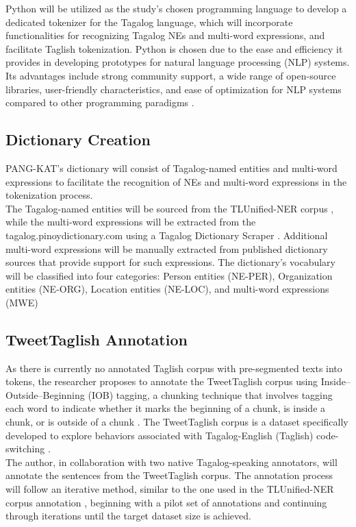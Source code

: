 \documentclass[journal]{./IEEE/IEEEtran}
\begin{document}
Python will be utilized as the study’s chosen programming language to develop a dedicated tokenizer for the Tagalog language, which will incorporate functionalities for recognizing Tagalog NEs and multi-word expressions, and facilitate Taglish tokenization. Python is chosen due to the ease and efficiency it provides in developing prototypes for natural language processing (NLP) systems.  Its advantages include strong community support, a wide range of open-source libraries, user-friendly characteristics, and ease of optimization for NLP systems compared to other programming paradigms {\cite{Python}}.

\subsection {Dictionary Creation}
PANG-KAT's dictionary will consist of Tagalog-named entities and multi-word expressions to facilitate the recognition of NEs and multi-word expressions in the tokenization process. \\

The Tagalog-named entities will be sourced from the TLUnified-NER corpus {\cite{TLUnified-NER}},  while the multi-word expressions will be extracted from the tagalog.pinoydictionary.com using a Tagalog Dictionary Scraper {\cite{tagDictScraper}}. Additional multi-word expressions will be manually extracted from published dictionary sources that provide support for such expressions. The dictionary’s vocabulary will be classified into four categories: Person entities (NE-PER), Organization entities (NE-ORG), Location entities (NE-LOC), and multi-word expressions (MWE)

\subsection {TweetTaglish Annotation}

As there is currently no annotated Taglish corpus with pre-segmented texts into tokens, the researcher proposes to annotate the TweetTaglish corpus {\cite{TweetTaglish}} using Inside–Outside–Beginning (IOB) tagging, a chunking technique that involves tagging each word to indicate whether it marks the beginning of a chunk, is inside a chunk, or is outside of a chunk {\cite{TLUnified-NER}}. The TweetTaglish corpus is a dataset specifically developed to explore behaviors associated with Tagalog-English (Taglish) code-switching {\cite{TweetTaglish}}. \\

The author, in collaboration with two native Tagalog-speaking annotators, will annotate the sentences from the TweetTaglish corpus. The annotation process will follow an iterative method, similar to the one used in the TLUnified-NER corpus annotation {\cite{TLUnified-NER}}, beginning with a pilot set of annotations and continuing through iterations until the target dataset size is achieved. \\
\end{document}

